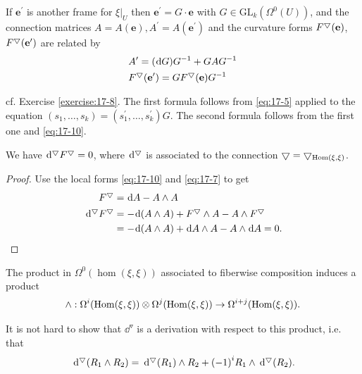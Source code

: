 If ${\mathbf{e}}^{\prime }$ is another frame for ${\left. \xi \right| }_{U}$ then ${\mathbf{e}}^{\prime } = G \cdot  \mathbf{e}$ 
with $G \in  {\mathrm{{GL}}}_{k}( {\Omega^0( U) })$, and the connection matrices $A = A( \mathbf{e}),{A}^{\prime } = A( \mathbf{e}^{\prime})$ 
and the curvature forms ${F}^\bigtriangledown( \mathbf{e})$, $F^\bigtriangledown ({\mathbf{e}}^{\prime })$ are related by
\begin{align}\label{eq:17-18}
  \begin{aligned}
    & {A}^{\prime } = ( {\!\dd G}) {G}^{-1} + {GA}{G}^{-1}\\
    & {F}^\btd( {\mathbf{e}}^{\prime })  = G{F}^\btd( \mathbf{e}) {G}^{-1}
  \end{aligned}
\end{align}

cf. Exercise \ref{exercise:17-8}. The first formula follows from \eqref{eq:17-5} applied to the 
equation $( {{s}_1,\ldots,{s}_{k}})  = ( {{s}_1^{\prime },\ldots,{s}_{k}^{\prime }}) G$. The second formula follows 
from the first one and \eqref{eq:17-10}.

\begin{theorem}\label{theorem:17-13}
  We have $\dd^\btd{F}^\btd = 0$, where $\dd^\btd$ is associated to the connection $\bigtriangledown = \bigtriangledown_{\operatorname{Hom}(\xi, \xi) }$.
\end{theorem}

\begin{proof}
Use the local forms \eqref{eq:17-10} and \eqref{eq:17-7} to get
\begin{align*}
  {F}^\btd & = {\!\dd A}- A \land  A \\
  \dd^\btd{F}^\btd 
    & = - \!\dd ( {A \land  A})  + {F}^\btd \land  A- A \land  {F}^\btd\\
    & = - \!\dd ( {A \land  A})  + {\!\dd A} \land  A- A \land  {\!\dd A} = 0.
\end{align*}
\end{proof}

The product in $\Omega^0( \hom(\xi, \xi))$ associated to fiberwise composition induces a product
\[
  \land:\Omega^{i}( \operatorname{Hom}(\xi, \xi))  \otimes  \Omega^{j}( \operatorname{Hom}(\xi, \xi)) 
  \rightarrow \Omega^{i + j}( \operatorname{Hom}(\xi, \xi)).
\]

It is not hard to show that $\dd^{ \triangledown  }$ is a derivation with respect to this product, i.e. that
\begin{align}\label{eq:17-19}
  \dd^\btd( {{R}_1 \land  {R}_{2}}) 
  = \dd^\btd( {R}_1)  \land  {R}_{2} + {(-1) }^{i}{R}_1 \land  \dd^\btd( {R}_{2}).
\end{align}

